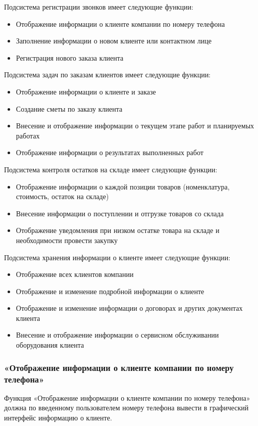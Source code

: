 \documentclass[a4paper,12pt]{article}
\begin{document}
Подсистема регистрации звонков имеет следующие функции:
\begin{itemize}
    \item Отображение информации о клиенте компании по номеру телефона
    \item Заполнение информации о новом клиенте или контактном лице
    \item Регистрация нового заказа клиента
\end{itemize}

Подсистема задач по заказам клиентов имеет следующие функции:
\begin{itemize}
    \item Отображение информации о клиенте и заказе
    \item Создание сметы по заказу клиента
    \item Внесение и отображение информации о текущем этапе работ и планируемых работах
    \item Отображение информации о результатах выполненных работ
\end{itemize}

Подсистема контроля остатков на складе имеет следующие функции:
\begin{itemize}
    \item Отображение информации о каждой позиции товаров (номенклатура, стоимость, остаток на складе)
    \item Внесение информации о поступлении и отгрузке товаров со склада
    \item Отображение уведомления при низком остатке товара на складе и необходимости провести закупку
\end{itemize}

Подсистема хранения информации о клиенте имеет следующие функции:
\begin{itemize}
    \item Отображение всех клиентов компании
    \item Отображение и изменение подробной информации о клиенте
    \item Отображение и изменение информации о договорах и других документах клиента
    \item Внесение и отображение информации о сервисном обслуживании оборудования клиента
\end{itemize}

\subsubsection{«Отображение информации о клиенте компании по номеру телефона»}
Функция «Отображение информации о клиенте компании по номеру телефона» должна по введенному пользователем номеру телефона вывести в графический интерфейс информацию о клиенте.\\
\end{document}
